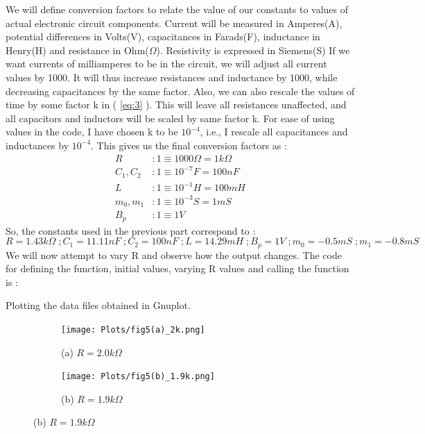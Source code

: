 \documentclass[12pt]{article}
\newcommand*{\myref}[1]{%
  \begingroup
    \hypersetup{
      linkcolor=linkequation,
      linkbordercolor=linkequation,
    }%
    \ref{#1}%
  \endgroup
}
\begin{document}
We will define conversion factors to relate the value of our constants to values of actual electronic circuit components. Current will be measured in Amperes(A), potential differences in Volts(V), capacitances in Farads(F), inductance in Henry(H) and resistance in Ohm($\Omega$). Resistivity is expressed in Siemens(S)\linebreak
If we want currents of milliamperes to be in the circuit, we will adjust all current values by 1000. It will thus increase resistances and inductance by 1000, while decreasing capacitances by the same factor. Also, we can also rescale the values of time by some factor k in (\myref{eq:3}). This will leave all resistances unaffected, and all capacitors and inductors will be scaled by same factor k. For ease of using values in the code, I have chosen k to be $10^{-4}$, i.e., I rescale all capacitances and inductances by $10^{-4}$. This gives us the final conversion factors as :
\begin{align*}
	R & : 1 \equiv 1000 \Omega = 1k\Omega \\
	C_1, C_2 & : 1 \equiv 10^{-7} F = 100 nF \\
	L & : 1 \equiv 10^{-1} H = 100 mH \\
	m_0, m_1 & : 1 \equiv 10^{-3} S = 1 mS \\
	B_p & : 1 \equiv 1 V
\end{align*}
So, the constants used in the previous part correspond to :
\[R=1.43k\Omega \; ;  C_1=11.11 nF \; ; C_2=100 nF \; ; L=14.29 mH \; ; B_p = 1V \; ; m_0 = -0.5 mS \; ; m_1 = -0.8 mS \]
We will now attempt to vary R and observe how the output changes. \linebreak
The code for defining the function, initial values, varying R values and calling the function is :

Plotting the data files obtained in Gnuplot. 
\begin{figure}[H] %
	\centering
	\caption{Fig 5. R Bifurcation in Theoretical Chua Circuit using a Three Segment Non-Linear Resistance}
	\begin{subfigure}[b]{0.5\textwidth}
		\centering
		\texttt{[image: Plots/fig5(a)\_2k.png]}
		\caption{(a) $R=2.0k\Omega$}
	\end{subfigure}%
	\begin{subfigure}[b]{0.5\textwidth}
		\centering
		\texttt{[image: Plots/fig5(b)\_1.9k.png]}
		\caption{(b) $R=1.9k\Omega$}
	\end{subfigure}
\end{figure}
\end{document}
